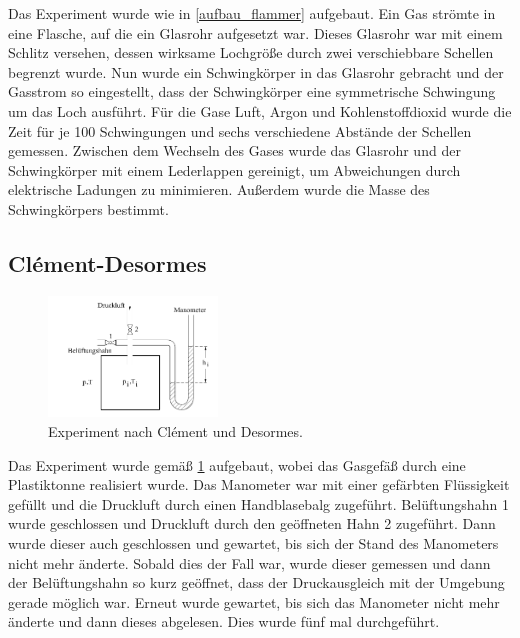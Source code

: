 \documentclass[
	a4paper,
	12pt,
	pagesize,
	ngerman
]{scrartcl}
\begin{document}
	Das Experiment wurde wie in \cref{aufbau_flammer} aufgebaut.
	Ein Gas strömte in eine Flasche, auf die ein Glasrohr aufgesetzt war.
	Dieses Glasrohr war mit einem Schlitz versehen, dessen wirksame Lochgröße durch zwei verschiebbare Schellen begrenzt wurde.
	Nun wurde ein Schwingkörper in das Glasrohr gebracht und der Gasstrom so eingestellt, dass der Schwingkörper eine symmetrische Schwingung um das Loch ausführt.
	Für die Gase Luft, Argon und Kohlenstoffdioxid wurde die Zeit für je 100 Schwingungen und sechs verschiedene Abstände der Schellen gemessen.
	Zwischen dem Wechseln des Gases wurde das Glasrohr und der Schwingkörper mit einem Lederlappen gereinigt, um Abweichungen durch elektrische Ladungen zu minimieren.
	Außerdem wurde die Masse des Schwingkörpers bestimmt.
	
	\subsection{Clément-Desormes}
	
	\begin{figure}[H]
		\includegraphics[width=0.4\textwidth]{clement}
		\centering
		\caption{Experiment nach Clément und Desormes. \cite{abbildungen}} %
		\label{aufbau_clement}
		\centering
	\end{figure} 
	
	Das Experiment wurde gemäß \cref{aufbau_clement} aufgebaut, wobei das Gasgefäß durch eine Plastiktonne realisiert wurde.
	Das Manometer war mit einer gefärbten Flüssigkeit gefüllt und die Druckluft durch einen Handblasebalg zugeführt.
	Belüftungshahn 1 wurde geschlossen und Druckluft durch den geöffneten Hahn 2 zugeführt.
	Dann wurde dieser auch geschlossen und gewartet, bis sich der Stand des Manometers nicht mehr änderte.
	Sobald dies der Fall war, wurde dieser gemessen und dann der Belüftungshahn so kurz geöffnet, dass der Druckausgleich mit der Umgebung gerade möglich war.
	Erneut wurde gewartet, bis sich das Manometer nicht mehr änderte und dann dieses abgelesen.
	Dies wurde fünf mal durchgeführt.
	
\end{document}
